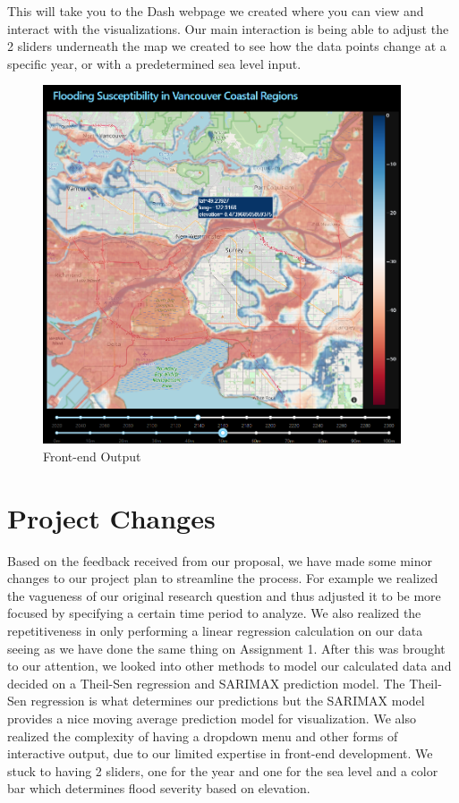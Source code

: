 \documentclass[fontsize=11pt]{article}
\begin{document}
    This will take you to the Dash webpage we created where you can view and interact with the visualizations. Our main interaction is being able to adjust the 2 sliders underneath the map we created to see how the data points change at a specific year, or with a predetermined sea level input. \\
    \begin{figure}[h]
        \centering
        \includegraphics[width=300pt]{frontend.png}
        \caption{Front-end Output}
    \end{figure}


    \section*{Project Changes}
    \hspace{\parindent}Based on the feedback received from our proposal, we have made some minor changes to our project plan to streamline the process. For example we realized the vagueness of our original research question and thus adjusted it to be more focused by specifying a certain time period to analyze. We also realized the repetitiveness in only performing a linear regression calculation on our data seeing as we have done the same thing on Assignment 1. After this was brought to our attention, we looked into other methods to model our calculated data and decided on a Theil-Sen regression and SARIMAX prediction model. The Theil-Sen regression is what determines our predictions but the SARIMAX model provides a nice moving average prediction model for visualization. We also realized the complexity of having a dropdown menu and other forms of interactive output, due to our limited expertise in front-end development. We stuck to having 2 sliders, one for the year and one for the sea level and a color bar which determines flood severity based on elevation.
\end{document}
